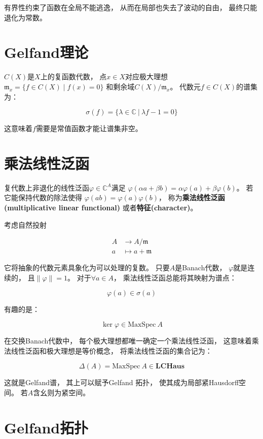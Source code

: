 \documentclass[10pt, openany]{book}
\begin{document}
有界性约束了函数在全局不能逃逸，
从而在局部也失去了波动的自由，
最终只能退化为常数。


\section{Gelfand理论}

$C(X)$是$X$上的复函数代数，
点$x\in X$对应极大理想
$\mathfrak m_x = \{ f \in C(X) \mid f(x) = 0 \}$
和剩余域$C(X)/\mathfrak m_x$。
代数元$f \in C(X)$的谱集为：

$$
\sigma(f) = \{ \lambda \in \mathbb C \ | \ \lambda f - 1 = 0 \}
$$

这意味着$f$需要是常值函数才能让谱集非空。

\section{乘法线性泛函}

复代数上非退化的线性泛函$\varphi \in \mathbb C^A$满足
$\varphi(\alpha a + \beta b) = \alpha \varphi(a) + \beta \varphi(b)$。
若它能保持代数的除法使得
$\varphi(ab) = \varphi(a)\varphi(b)$，
称为\textbf{乘法线性泛函(multiplicative linear functional)}
或者\textbf{特征(character)}。

考虑自然投射

$$
\begin{aligned}
  A &\to A/\mathfrak m \\
  a &\mapsto a + \mathfrak m
\end{aligned}
$$



它将抽象的代数元素具象化为可以处理的复数。
只要$A$是Banach代数，
$\varphi$就是连续的，
且$\| \varphi \| = 1$。
对于$\forall a \in A$，
乘法线性泛函总能将其映射为谱点：

$$
\varphi(a) \in \sigma(a)
$$

有趣的是：

$$
\ker \varphi \in \text{MaxSpec} \ A
$$

在交换Banach代数中，
每个极大理想都唯一确定一个乘法线性泛函，
这意味着乘法线性泛函和极大理想是等价概念，
将乘法线性泛函的集合记为：

$$
\Delta(A) = \text{MaxSpec} \ A \in \textbf{LCHaus}
$$

这就是Gelfand谱，
其上可以赋予Gelfand 拓扑，
使其成为局部紧Hausdorff空间。
若$A$含幺则为紧空间。

\section{Gelfand拓扑}
\end{document}
